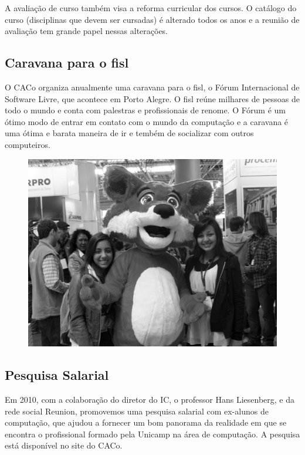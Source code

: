 A avaliação de curso também visa a reforma curricular dos cursos. O catálogo do
curso (disciplinas que devem ser cursadas) é alterado todos os anos e a reunião
de avaliação tem grande papel nessas alterações.

\subsection{Caravana para o fisl}

O CACo organiza anualmente uma caravana para o fisl, o Fórum Internacional de
Software Livre, que acontece em Porto Alegre. O fisl reúne milhares de pessoas
de todo o mundo e conta com palestras e profissionais de renome. O Fórum é um
ótimo modo de entrar em contato com o mundo da computação e a caravana é uma
ótima e barata maneira de ir e tembém de socializar com outros computeiros.

\begin{figure}[H]
    \centering
    \includegraphics[scale=0.21]{img/alem_da_graduacao/caco_fisl1.jpg}
\end{figure}

\subsection{Pesquisa Salarial}

Em 2010, com a colaboração do diretor do IC, o professor Hans Liesenberg, e da
rede social Reunion, promovemos uma pesquisa salarial com ex-alunos de
computação, que ajudou a fornecer um bom panorama da realidade em que se
encontra o profissional formado pela Unicamp na área de computação. A pesquisa
está disponível no site do CACo.

